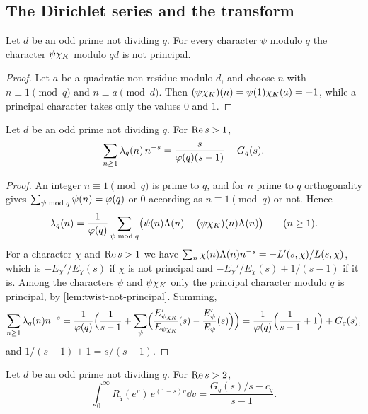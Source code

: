 \subsection{The Dirichlet series and the transform}\label{ss:dirichlet-series}

\begin{lemma}\label{lem:twist-not-principal}
Let $d$ be an odd prime not dividing $q$. For every character $\psi$ modulo $q$ the character
$\psi\chi_K$ modulo $qd$ is not principal.
\end{lemma}

\begin{proof}
Let $a$ be a quadratic non-residue modulo $d$, and choose $n$ with $n\equiv1\pmod q$ and
$n\equiv a\pmod d$. Then $(\psi\chi_K)(n)=\psi(1)\chi_K(a)=-1$, while a principal character takes
only the values $0$ and $1$.
\end{proof}

\begin{lemma}\label{lem:dirichlet-series}
Let $d$ be an odd prime not dividing $q$. For $\operatorname{Re} s>1$,
\[
  \sum_{n\ge1}\lambda_q(n)\,n^{-s}=\frac{s}{\varphi(q)(s-1)}+G_q(s).
\]
\end{lemma}

\begin{proof}
An integer $n\equiv1\pmod q$ is prime to $q$, and for $n$ prime to $q$ orthogonality gives
$\sum_{\psi\bmod q}\psi(n)=\varphi(q)$ or $0$ according as $n\equiv1\pmod q$ or not. Hence
\[
  \lambda_q(n)=\frac{1}{\varphi(q)}\sum_{\psi\bmod q}
  \bigl(\psi(n)\Lambda(n)-(\psi\chi_K)(n)\Lambda(n)\bigr)\qquad(n\ge1).
\]
For a character $\chi$ and $\operatorname{Re} s>1$ we have $\sum_n\chi(n)\Lambda(n)n^{-s}=-L'(s,\chi)/L(s,\chi)$,
which is $-E_\chi'/E_\chi(s)$ if $\chi$ is not principal and $-E_\chi'/E_\chi(s)+1/(s-1)$ if it is.
Among the characters $\psi$ and $\psi\chi_K$ only the principal character modulo $q$ is principal,
by \cref{lem:twist-not-principal}. Summing,
\[
  \sum_{n\ge1}\lambda_q(n)n^{-s}
  =\frac{1}{\varphi(q)}\Bigl(\frac{1}{s-1}
   +\sum_{\psi}\Bigl(\frac{E_{\psi\chi_K}'}{E_{\psi\chi_K}}(s)-\frac{E_\psi'}{E_\psi}(s)\Bigr)\Bigr)
  =\frac{1}{\varphi(q)}\Bigl(\frac{1}{s-1}+1\Bigr)+G_q(s),
\]
and $1/(s-1)+1=s/(s-1)$.
\end{proof}

\begin{lemma}\label{lem:transform}
Let $d$ be an odd prime not dividing $q$. For $\operatorname{Re} s>2$,
\[
  \int_0^\infty R_q(e^v)\,e^{(1-s)v}\dd v=\frac{G_q(s)/s-c_q}{s-1}.
\]
\end{lemma}

